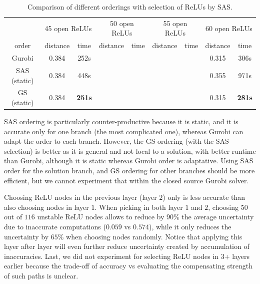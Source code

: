 \begin{table}[t!]	
	\centering
	\begin{tabular}{|c||c c|c c|c c|c c|}
		\hline
		  & \multicolumn{2}{c|}{45 open ReLUs} & \multicolumn{2}{c|}{50 open ReLUs} 
		  & \multicolumn{2}{c|}{55 open ReLUs} & \multicolumn{2}{c|}{60 open ReLUs}\\ 
		 order & distance & time & distance & time & distance & time & distance & time \\
		\hline \hline
		Gurobi & 0.384 & 252s & &  & & & 0.315  & 306s  \\ 
		SAS (static) & 0.384 & 448s & &  & & & 0.355  & 971s \\
		GS (static) & 0.384 & {\bf 251s} & &  &  & & 0.315 & {\bf 281s} \\ \hline
	\end{tabular}
	\caption{Comparison of different orderings with selection of ReLUs by SAS.}
	\label{table.order}
	
\end{table}

SAS ordering is particularly counter-productive because it is static, and it is accurate only for one branch (the most complicated one), whereas Gurobi can adapt the order to each branch.
However, the GS ordering (with the SAS selection) is better as it is general and not local to a solution, with better runtime than Gurobi, although it is static whereas Gurobi order is adaptative. Using SAS order for the solution branch, and GS ordering for other branches should be more efficient, but we cannot experiment that within the closed source Gurobi solver.

\iffalse
Choosing ReLU nodes in the previous layer (layer $2$) only is less accurate than 
also choosing nodes in layer $1$. When picking in both layer $1$ and $2$, choosing $50$ out of $116$ unstable ReLU nodes allows to reduce by $90\%$ the average uncertainty due to inaccurate computations ($0.059$ vs $0.574$), while it only reduces the uncertainty by $65\%$ when choosing nodes randomly. Notice that applying this layer after layer will even further reduce uncertainty created by accumulation of inaccuracies. 
Last, we did not experiment for selecting ReLU nodes in 3+ layers earlier because the trade-off of accuracy vs evaluating the compensating strength of such paths is unclear.

